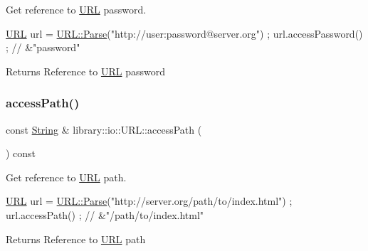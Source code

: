 Get reference to \hyperlink{classlibrary_1_1io_1_1_u_r_l}{U\+RL} password. 


\begin{DoxyCode}
\hyperlink{classlibrary_1_1io_1_1_u_r_l_a7e9c070138a6dbd000ffb10b7cd8a5c4}{URL} url = \hyperlink{classlibrary_1_1io_1_1_u_r_l_a03a589af0787df20428d4d33e26bb2d7}{URL::Parse}(\textcolor{stringliteral}{"http://user:password@server.org"}) ;
url.accessPassword() ; \textcolor{comment}{// &"password"}
\end{DoxyCode}


\begin{DoxyReturn}{Returns}
Reference to \hyperlink{classlibrary_1_1io_1_1_u_r_l}{U\+RL} password 
\end{DoxyReturn}
\mbox{\label{classlibrary_1_1io_1_1_u_r_l_a9c642f5d01f0a67f6cec48370a9d60cd}} 
\subsubsection{\texorpdfstring{access\+Path()}{accessPath()}}
{\footnotesize\ttfamily const \hyperlink{namespacelibrary_1_1io_a7469b45835a4421045db344d6a5a1f85}{String} \& library\+::io\+::\+U\+R\+L\+::access\+Path (\begin{DoxyParamCaption}{ }\end{DoxyParamCaption}) const}



Get reference to \hyperlink{classlibrary_1_1io_1_1_u_r_l}{U\+RL} path. 


\begin{DoxyCode}
\hyperlink{classlibrary_1_1io_1_1_u_r_l_a7e9c070138a6dbd000ffb10b7cd8a5c4}{URL} url = \hyperlink{classlibrary_1_1io_1_1_u_r_l_a03a589af0787df20428d4d33e26bb2d7}{URL::Parse}(\textcolor{stringliteral}{"http://server.org/path/to/index.html"}) ;
url.accessPath() ; \textcolor{comment}{// &"/path/to/index.html"}
\end{DoxyCode}


\begin{DoxyReturn}{Returns}
Reference to \hyperlink{classlibrary_1_1io_1_1_u_r_l}{U\+RL} path 
\end{DoxyReturn}
\mbox{\label{classlibrary_1_1io_1_1_u_r_l_a07d542a70796d827c3f84dffa61a988e}} 
